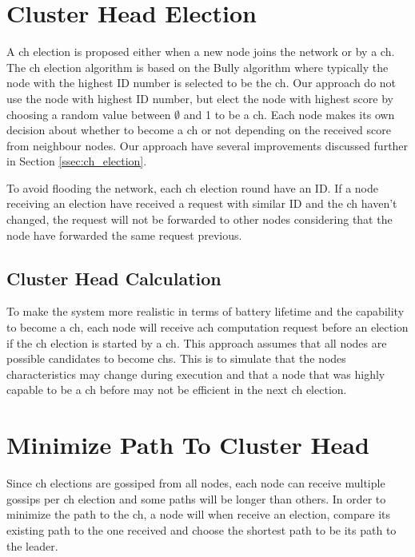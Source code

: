 \documentclass[USenglish]{uit-thesis}
\begin{document}
\section{Cluster Head Election} \label{imp:ch_election}


A \gls{ch} election is proposed either when a new node joins the network or by a \gls{ch}. 
The \gls{ch} election algorithm is based on the Bully algorithm \cite{bully} where typically the node with the highest ID number is selected to be the \gls{ch}. Our approach do not use the node with highest ID number, but elect the node with highest score by choosing a random value between $\emptyset$ and 1 to be a \gls{ch}. Each node makes its own decision about whether to become a \gls{ch} or not depending on the received score from neighbour nodes.
Our approach have several improvements discussed further in Section \ref{ssec:ch_election}. 

To avoid flooding the network, each \gls{ch} election round have an ID. If a node receiving an election have received a request with similar ID and the \gls{ch} haven't changed, the request will not be forwarded to other nodes considering that the node have forwarded the same request previous.

\subsection{Cluster Head Calculation}
To make the system more realistic in terms of battery lifetime and the capability to become a \gls{ch}, each node will receive a\gls{ch} computation request before an election if the \gls{ch} election is started by a \gls{ch}. This approach assumes that all nodes are possible candidates to become \gls{ch}s. This is to simulate that the nodes characteristics may change during execution and that a node that was highly capable to be a \gls{ch} before may not be efficient in the next \gls{ch} election.


\section{Minimize Path To Cluster Head}
Since \gls{ch} elections are gossiped from all nodes, each node can receive multiple gossips per \gls{ch} election and some paths will be longer than others. In order to minimize the path to the \gls{ch}, a node will when receive an election, compare its existing path to the one received \cite{dijkstra} and choose the shortest path to be its path to the leader.
\end{document}
